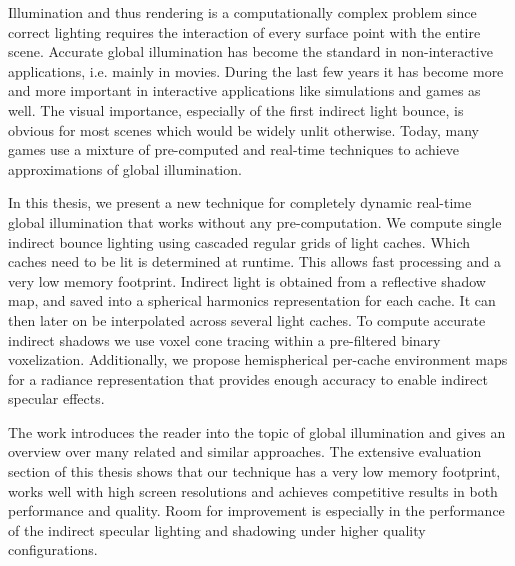 \documentclass[thesis.tex]{subfiles}
\begin{document}

Illumination and thus rendering is a computationally complex problem since correct lighting requires the interaction of every surface point with the entire scene.
Accurate global illumination has become the standard in non-interactive applications, i.e. mainly in movies.
During the last few years it has become more and more important in interactive applications like simulations and games as well.
The visual importance, especially of the first indirect light bounce, is obvious for most scenes which would be widely unlit otherwise.
Today, many games use a mixture of pre-computed and real-time techniques to achieve approximations of global illumination.

In this thesis, we present a new technique for completely dynamic real-time global illumination that works without any pre-computation.
We compute single indirect bounce lighting using cascaded regular grids of light caches.
Which caches need to be lit is determined at runtime.
This allows fast processing and a very low memory footprint.
Indirect light is obtained from a reflective shadow map, and saved into a spherical harmonics representation for each cache.
It can then later on be interpolated across several light caches.
To compute accurate indirect shadows we use voxel cone tracing within a pre-filtered binary voxelization.
Additionally, we propose hemispherical per-cache environment maps for a radiance representation that provides enough accuracy to enable indirect specular effects.

The work introduces the reader into the topic of global illumination and gives an overview over many related and similar approaches.
The extensive evaluation section of this thesis shows that our technique has a very low memory footprint, works well with high screen resolutions and achieves competitive results in both performance and quality.
Room for improvement is especially in the performance of the indirect specular lighting and shadowing under higher quality configurations.
\end{document}
